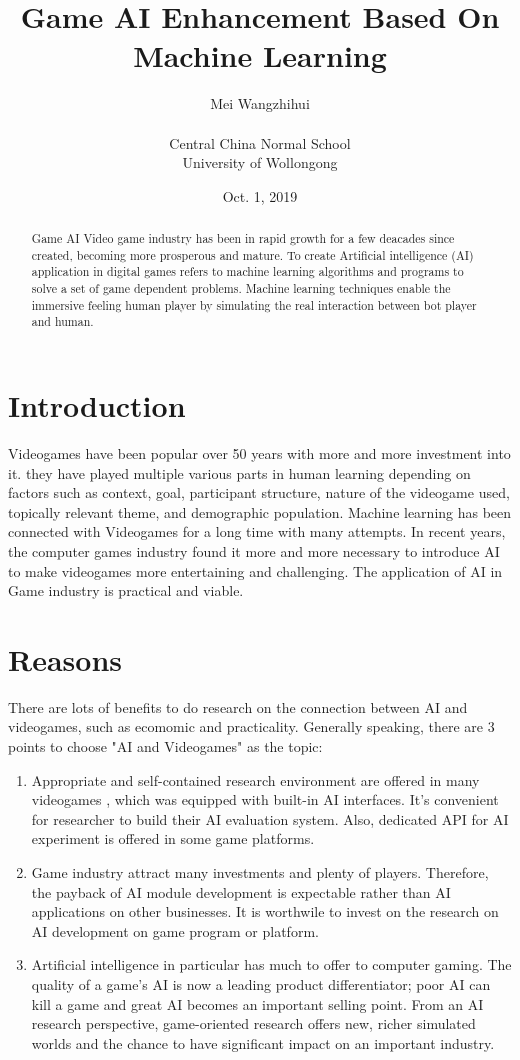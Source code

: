 \documentclass{article}
\title{Game AI Enhancement Based On Machine Learning}
\author{ Mei Wangzhihui \\ \\
Central China Normal School\\
University of Wollongong
\\
}
\date{Oct. 1, 2019}
\begin{document}
\maketitle

\begin{abstract}
Game AI
Video game industry has been in rapid growth for a few deacades since created, becoming more prosperous and mature. To create 
Artificial intelligence (AI) application in digital games refers to machine learning algorithms and programs to solve a set of game dependent problems. Machine learning techniques enable the immersive feeling human player by simulating the real interaction between bot player and human.\cite{1}
\end{abstract}

\section{Introduction}
Videogames have been popular over 50 years with more and more investment into it. they have played multiple various parts in human learning depending on factors such as context, goal, participant structure, nature of the videogame used, topically relevant theme, and demographic population. \cite{2} Machine learning has been connected with Videogames for a long time with many attempts. \cite{3} In recent years, the computer games industry found it more and more necessary to introduce AI to make videogames more entertaining and challenging. \cite{4,5} The application of AI in Game industry is practical and viable. \cite{6}



\section{Reasons}
There are lots of benefits to do research on the connection between AI and videogames, such as ecomomic and practicality. \cite{7} Generally speaking, there are 3 points to choose "AI and Videogames" as the topic: 
\begin{enumerate}
    \item Appropriate and self-contained research environment are offered in many videogames \cite{8}, which was equipped with built-in AI interfaces. It's convenient for researcher to build their AI evaluation system. Also, dedicated API for AI experiment is offered in some game platforms. \cite{9} 
    \item Game industry attract many investments and plenty of players. Therefore, the payback of AI module development is expectable rather than AI applications on other businesses.\cite{8} It is worthwile to invest on the research on AI development on game program or platform.
    \item Artificial intelligence in particular has much to offer to computer gaming. The quality of a game’s AI is now a leading product differentiator; poor AI can kill a game and great AI becomes an important selling point. From an AI research perspective, game-oriented research offers new, richer simulated worlds and the chance to have significant impact on an important industry. \cite{5}
\end{enumerate}
\end{document}
